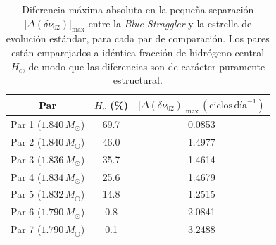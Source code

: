 \begin{table}[htpb]
  \centering
  \begin{tabular}{
      c
      c
      c
    }
    \toprule
    {Par} & {$H_c$ (\%)} & {$|\Delta(\delta\nu_{02})|_\mathrm{max}\,(\text{ciclos}\,\text{día}^{-1})$} \\
    \midrule
    Par 1 ($1.840\,M_\odot$) & 69.7 & 0.0853 \\
    Par 2 ($1.840\,M_\odot$) & 46.0 & 1.4977 \\
    Par 3 ($1.836\,M_\odot$) & 35.7 & 1.4614 \\
    Par 4 ($1.834\,M_\odot$) & 25.6 & 1.4679 \\
    Par 5 ($1.832\,M_\odot$) & 14.8 & 1.2515 \\
    Par 6 ($1.790\,M_\odot$) &  0.8 & 2.0841 \\
    Par 7 ($1.790\,M_\odot$) &  0.1 & 3.2488 \\
    \bottomrule
  \end{tabular}
  \caption{Diferencia máxima absoluta en la pequeña separación $|\Delta(\delta\nu_{02})|_\mathrm{max}$ entre la \textit{Blue Straggler} y la estrella de evolución estándar, para cada par de comparación. Los pares están emparejados a idéntica fracción de hidrógeno central $H_c$, de modo que las diferencias son de carácter puramente estructural.}
  \label{tab:max_diff_smallsep}
\end{table}